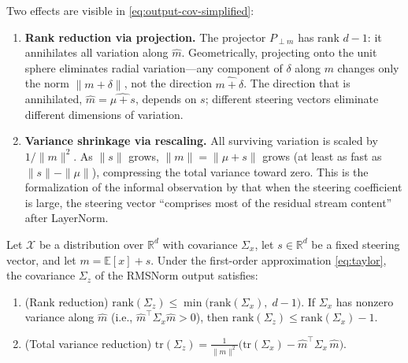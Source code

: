Two effects are visible in \eqref{eq:output-cov-simplified}:
\begin{enumerate}
  \item \textbf{Rank reduction via projection.}
    The projector $P_{\perp m}$ has rank $d - 1$: it annihilates all variation along $\hat{m}$.
    Geometrically, projecting onto the unit sphere eliminates radial variation---any component of $\delta$ along $m$ changes only the norm $\|m + \delta\|$, not the direction $\widehat{m + \delta}$.
    The direction that is annihilated, $\hat{m} = \widehat{\mu + s}$, depends on $s$; different steering vectors eliminate different dimensions of variation.

  \item \textbf{Variance shrinkage via rescaling.}
    All surviving variation is scaled by $1/\|m\|^2$.
    As $\|s\|$ grows, $\|m\| = \|\mu + s\|$ grows (at least as fast as $\|s\| - \|\mu\|$), compressing the total variance toward zero.
    This is the formalization of the informal observation by \citet{turntrout2023steering} that when the steering coefficient is large, the steering vector ``comprises most of the residual stream content'' after LayerNorm.
\end{enumerate}

\begin{proposition}
\label{prop:diversity-reduction}
Let $\mathcal{X}$ be a distribution over $\mathbb{R}^d$ with covariance $\Sigma_x$, let $s \in \mathbb{R}^d$ be a fixed steering vector, and let $m = \mathbb{E}[x] + s$.
Under the first-order approximation \eqref{eq:taylor}, the covariance $\Sigma_z$ of the RMSNorm output satisfies:
%
\begin{enumerate}
  \item \textup{(Rank reduction)}
    $\mathrm{rank}(\Sigma_z) \leq \min\!\big(\mathrm{rank}(\Sigma_x),\; d - 1\big)$.
    If $\Sigma_x$ has nonzero variance along $\hat{m}$ (i.e., $\hat{m}^\top \Sigma_x \hat{m} > 0$), then $\mathrm{rank}(\Sigma_z) \leq \mathrm{rank}(\Sigma_x) - 1$.

  \item \textup{(Total variance reduction)}
    $\mathrm{tr}(\Sigma_z) = \frac{1}{\|m\|^2}\big(\mathrm{tr}(\Sigma_x) - \hat{m}^\top \Sigma_x\, \hat{m}\big)$.
\end{enumerate}
\end{proposition}

